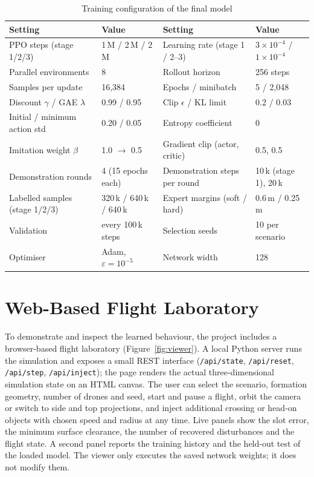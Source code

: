 \begin{table}[htbp]
\centering
\caption{Training configuration of the final model}
\label{tab:hyper}
\footnotesize
\setlength{\tabcolsep}{4pt}
\begin{tabular}{@{}llll@{}}
\toprule
Setting & Value & Setting & Value\\
\midrule
PPO steps (stage 1/2/3) & 1\,M / 2\,M / 2\,M & Learning rate (stage 1 / 2--3) & $3\!\times\!10^{-4}$ / $1\!\times\!10^{-4}$\\
Parallel environments & 8 & Rollout horizon & 256 steps\\
Samples per update & 16{,}384 & Epochs / minibatch & 5 / 2{,}048\\
Discount $\gamma$ / GAE $\lambda$ & 0.99 / 0.95 & Clip $\epsilon$ / KL limit & 0.2 / 0.03\\
Initial / minimum action std & 0.20 / 0.05 & Entropy coefficient & 0\\
Imitation weight $\beta$ & 1.0 $\to$ 0.5 & Gradient clip (actor, critic) & 0.5, 0.5\\
Demonstration rounds & 4 (15 epochs each) & Demonstration steps per round & 10\,k (stage 1), 20\,k\\
Labelled samples (stage 1/2/3) & 320\,k / 640\,k / 640\,k & Expert margins (soft / hard) & 0.6\,m / 0.25\,m\\
Validation & every 100\,k steps & Selection seeds & 10 per scenario\\
Optimiser & Adam, $\varepsilon = 10^{-5}$ & Network width & 128\\
\bottomrule
\end{tabular}
\end{table}

\section{Web-Based Flight Laboratory}
To demonstrate and inspect the learned behaviour, the project includes a browser-based flight laboratory
(Figure~\ref{fig:viewer}). A local Python server runs the simulation and exposes a small REST interface
(\texttt{/api/state}, \texttt{/api/reset}, \texttt{/api/step}, \texttt{/api/inject}); the page renders the
actual three-dimensional simulation state on an HTML canvas. The user can select the scenario, formation
geometry, number of drones and seed, start and pause a flight, orbit the camera or switch to side and top
projections, and inject additional crossing or head-on objects with chosen speed and radius at any time. Live
panels show the slot error, the minimum surface clearance, the number of recovered disturbances and the flight
state. A second panel reports the training history and the held-out test of the loaded model. The viewer only
executes the saved network weights; it does not modify them.

